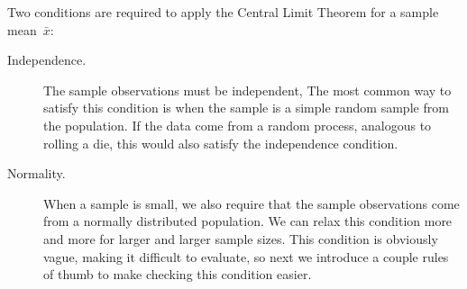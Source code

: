 \noindent%
Two conditions are required to apply the
Central Limit Theorem
for a sample mean~$\bar{x}$:
\begin{description}
\item[Independence.]
    The sample observations must be independent,
    The most common way to satisfy this condition is
    when the sample is a simple random sample from the
    population.
    If the data come from a random process,
    analogous to rolling a die,
    this would also satisfy the independence condition.
\item[Normality.]
    When a sample is small,
    we also require that the sample observations
    come from a normally distributed population.
    We can relax this condition more and more
    for larger and larger sample sizes.
    This condition is obviously vague,
    making it difficult to evaluate,
    so next we introduce a couple rules of thumb
    to make checking this condition easier.
\end{description}
%
%
%
%

